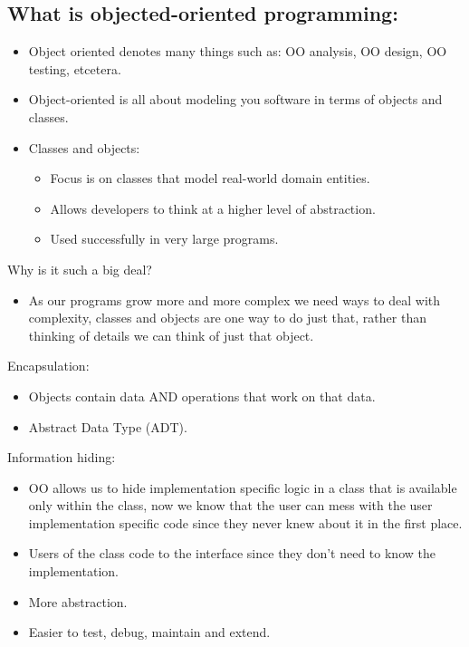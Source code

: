 \subsection{What is objected-oriented programming:}
\begin{itemize}
    \item Object oriented denotes many things such as: OO analysis, OO design, OO testing, etcetera.
    \item Object-oriented is all about modeling you software in terms of objects and classes.
    \item Classes and objects:
        \begin{itemize}
            \item Focus is on classes that model real-world domain entities.
            \item Allows developers to think at a higher level of abstraction.
            \item Used successfully in very large programs.
        \end{itemize}
\end{itemize}

Why is it such a big deal?
\begin{itemize}
    \item As our programs grow more and more complex we need ways to deal with complexity, classes and objects are one way to do just that, rather than thinking of details we can think of just that object.
\end{itemize}

Encapsulation:
\begin{itemize}
    \item Objects contain data AND operations that work on that data.
    \item Abstract Data Type (ADT).
\end{itemize}

Information hiding:
\begin{itemize}
    \item OO allows us to hide implementation specific logic in a class that is available only within the class, now we know that the user can mess with the user implementation specific code since they never knew about it in the first place.
    \item Users of the class code to the interface since they don't need to know the implementation.
    \item More abstraction.
    \item Easier to test, debug, maintain and extend.
\end{itemize}

